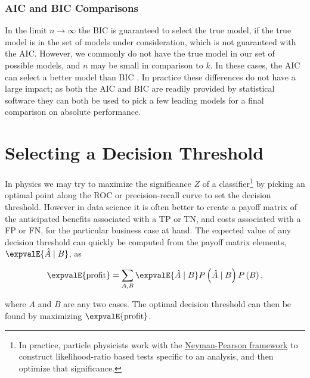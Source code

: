 \subsubsection{AIC and BIC Comparisons}
\label{ml_general:eval:BIC_comp_AIC}

In the limit $n \to \infty$ the BIC is guaranteed to select the true model,
if the true model is in the set of models under consideration,
which is not guaranteed with the AIC.
However, we commonly do not have the true model in our set of possible models,
and $n$ may be small in comparison to $k$.
In these cases, the AIC can select a better model than BIC
\cite{1311138,doi:10.1177/0049124104268644,Vrieze_2012,8498082}.
In practice these differences do not have a large impact;
as both the AIC and BIC are readily provided by statistical software
they can both be used to pick a few leading models
for a final comparison on absolute performance.

\section{Selecting a Decision Threshold}
\label{ml_general:decision_threshold}


In physics we may try to maximize the significance $Z$ of a classifier\footnote{In practice,
particle physicists work with the \href{https://en.wikipedia.org/wiki/Neyman\%E2\%80\%93Pearson\_lemma}{Neyman-Pearson framework}
to construct likelihood-ratio based tests specific to an analysis, and then optimize that significance.} by
picking an optimal point along the ROC or precision-recall curve to set the decision threshold.
However in data science it is often better to create a payoff matrix of the anticipated
benefits associated with a TP or TN, and costs associated with a FP or FN,
for the particular business case at hand.
The expected value of any decision threshold can quickly be computed
from the payoff matrix elements, $\expvalE{\hat{A} \mid B}$, as

\begin{equation} \label{eq:E_profit}
\expvalE{\text{profit}} = \sum_{A,B} \expvalE{\hat{A} \mid B} P\left(\hat{A} \mid B \right) P\left(B\right),
\end{equation}

\noindent where $A$ and $B$ are any two cases.
The optimal decision threshold can then be found by maximizing $\expvalE{\text{profit}}$.


